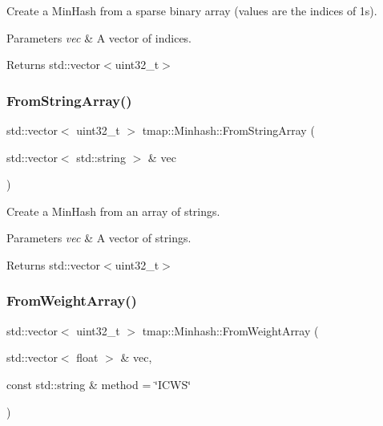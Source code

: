 Create a Min\+Hash from a sparse binary array (values are the indices of 1s). 


\begin{DoxyParams}{Parameters}
{\em vec} & A vector of indices. \\
\hline
\end{DoxyParams}
\begin{DoxyReturn}{Returns}
std\+::vector$<$uint32\+\_\+t$>$ 
\end{DoxyReturn}
\mbox{\label{classtmap_1_1Minhash_ab21e92280c7265a8df9477734361b8fc}} 
\subsubsection{\texorpdfstring{From\+String\+Array()}{FromStringArray()}}
{\footnotesize\ttfamily std\+::vector$<$ uint32\+\_\+t $>$ tmap\+::\+Minhash\+::\+From\+String\+Array (\begin{DoxyParamCaption}\item[{std\+::vector$<$ std\+::string $>$ \&}]{vec }\end{DoxyParamCaption})}



Create a Min\+Hash from an array of strings. 


\begin{DoxyParams}{Parameters}
{\em vec} & A vector of strings. \\
\hline
\end{DoxyParams}
\begin{DoxyReturn}{Returns}
std\+::vector$<$uint32\+\_\+t$>$ 
\end{DoxyReturn}
\mbox{\label{classtmap_1_1Minhash_aac0a45bdf6a6517e711a171357c8c73b}} 
\subsubsection{\texorpdfstring{From\+Weight\+Array()}{FromWeightArray()}}
{\footnotesize\ttfamily std\+::vector$<$ uint32\+\_\+t $>$ tmap\+::\+Minhash\+::\+From\+Weight\+Array (\begin{DoxyParamCaption}\item[{std\+::vector$<$ float $>$ \&}]{vec,  }\item[{const std\+::string \&}]{method = {\ttfamily \char`\"{}ICWS\char`\"{}} }\end{DoxyParamCaption})}



